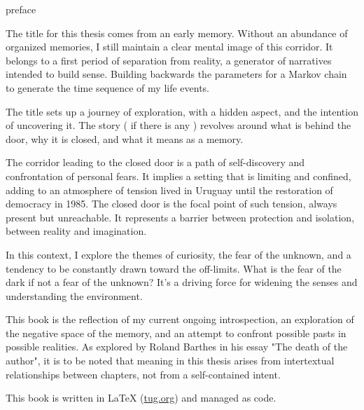 
\begin{center}
\vspace*{\fill}
\Huge preface

\vspace{2cm}

\end{center}

\normalsize


The title for this thesis comes from an early memory. Without an abundance of organized memories, I still maintain a clear mental image of this corridor. It belongs to a first period of separation from reality, a generator of narratives intended to build sense. Building backwards the parameters for a Markov chain to generate the time sequence of my life events.    

The title sets up a journey of exploration, with a hidden aspect, and the intention of uncovering it. The story ( if there is any ) {r}evolves around what is behind the door, why it is closed, and what it means as a memory.

The corridor leading to the closed door is a path of self-discovery and confrontation of personal fears. It implies a setting that is limiting and confined, adding to an atmosphere of tension lived in Uruguay until the restoration of democracy in 1985. The closed door is the focal point of such tension, always present but unreachable. It represents a barrier between protection and isolation, between reality and imagination.

In this context, I explore the themes of curiosity, the fear of the unknown, and a tendency to be constantly drawn toward the off-limits. What is the fear of the dark if not a fear of the unknown? It’s a driving force for widening the senses and understanding the environment.

This book is the reflection of my current ongoing introspection, an exploration of the negative space of the memory, and an attempt to confront possible pasts in possible realities. As explored by Roland Barthes in his essay "The death of the author"\citep{barthes1967}, it is to be noted that meaning in this thesis arises from intertextual relationships between chapters, not from a self-contained intent.

This book is written in \LaTeX{} (\href{https://www.tug.org/texlive/quickinstall.html}{tug.org}) and managed as code.


